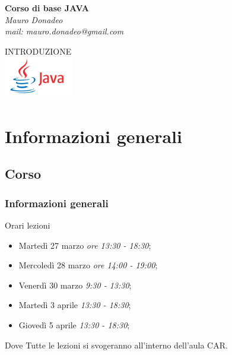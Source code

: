 \begin{frame}
	\begin{block}{}
		\begin{center}
			{\large\textbf{Corso di base JAVA}}\\
			\itshape{Mauro Donadeo}\\
			mail: mauro.donadeo@gmail.com
		\end{center}
	\end{block}
	\begin{block}{}	
		\begin{center}
			\large{INTRODUZIONE}\\
			\includegraphics[width = 30mm]{images/java-logo.jpg}
		\end{center}
	\end{block}	
\end{frame}

\section{Informazioni generali}
\subsection{Corso}
\begin{frame}
\frametitle{Informazioni generali}
\begin{block}{Orari lezioni}
\begin{itemize}
\item Martedì 27 marzo {\itshape ore 13:30 - 18:30};
\item Mercoledì 28 marzo {\itshape ore 14:00 - 19:00};
\item Venerdì 30 marzo {\itshape 9:30 - 13:30};
\item Martedì 3 aprile {\itshape 13:30 - 18:30};
\item Giovedì 5 aprile {\itshape 13:30 - 18:30};
\end{itemize}
\end{block}
\begin{block}{Dove}
Tutte le lezioni si svogeranno all'interno dell'aula CAR.
\end{block}
\end{frame}

